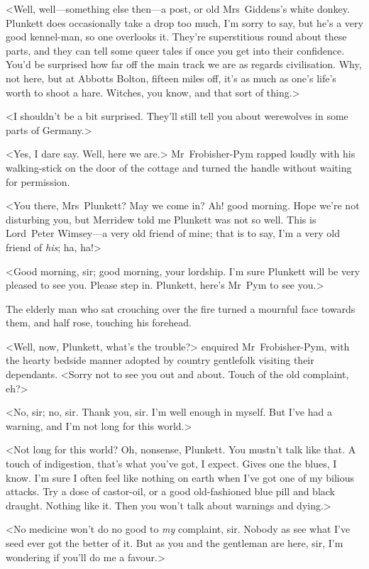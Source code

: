 <Well, well—something else then—a post, or old Mrs~Giddens's white donkey. Plunkett does occasionally take a drop too much, I'm sorry to say, but he's a very good kennel-man, so one overlooks it. They're superstitious round about these parts, and they can tell some queer tales if once you get into their confidence. You'd be surprised how far off the main track we are as regards civilisation. Why, not here, but at Abbotts Bolton, fifteen miles off, it's as much as one's life's worth to shoot a hare. Witches, you know, and that sort of thing.>

<I shouldn't be a bit surprised. They'll still tell you about werewolves in some parts of Germany.>

<Yes, I dare say. Well, here we are.> Mr~Frobisher-Pym rapped loudly with his walking-stick on the door of the cottage and turned the handle without waiting for permission.

<You there, Mrs~Plunkett? May we come in? Ah! good morning. Hope we're not disturbing you, but Merridew told me Plunkett was not so well. This is Lord~Peter Wimsey—a very old friend of mine; that is to say, I'm a very old friend of \emph{his}; ha, ha!>

<Good morning, sir; good morning, your lordship. I'm sure Plunkett will be very pleased to see you. Please step in. Plunkett, here's Mr~Pym to see you.>

The elderly man who sat crouching over the fire turned a mournful face towards them, and half rose, touching his forehead.

<Well, now, Plunkett, what's the trouble?> enquired Mr~Frobisher-Pym, with the hearty bedside manner adopted by country gentlefolk visiting their dependants. <Sorry not to see you out and about. Touch of the old complaint, eh?>

<No, sir; no, sir. Thank you, sir. I'm well enough in myself. But I've had a warning, and I'm not long for this world.>

<Not long for this world? Oh, nonsense, Plunkett. You mustn't talk like that. A touch of indigestion, that's what you've got, I expect. Gives one the blues, I know. I'm sure I often feel like nothing on earth when I've got one of my bilious attacks. Try a dose of castor-oil, or a good old-fashioned blue pill and black draught. Nothing like it. Then you won't talk about warnings and dying.>

<No medicine won't do no good to \emph{my} complaint, sir. Nobody as see what I've seed ever got the better of it. But as you and the gentleman are here, sir, I'm wondering if you'll do me a favour.>

